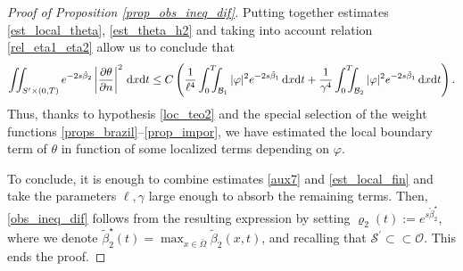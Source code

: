 \documentclass[preprint,10pt]{article}
\numberwithin{equation}{section}
\numberwithin{theorem}{section}
\def\dx{\,\textnormal{d}x}
\def\dt{\textnormal{d}t}
\def\dx{\,\textnormal{d}x}
\def\dt{\textnormal{d}t}
\begin{document}
{\begin{proof}[Proof of Proposition \ref{prop_obs_ineq_dif}]
Putting together estimates \eqref{est_local_theta}, \eqref{est_theta_h2} and taking into account relation \eqref{rel_eta1_eta2} allow us to conclude that
%
\begin{equation}\label{est_local_fin}
\iint_{S^{\prime}\times(0,T)}e^{-2s\tilde\beta_2}\left|\frac{\partial \theta}{\partial n}\right|^2\dx\dt  \leq C\left(\frac{1}{\ell^4}\int_0^T\!\!\!\!\int_{\mathcal B_1}|\varphi|^2e^{-2s\tilde{\beta}_1}\dx\dt+\frac{1}{\gamma^4}\int_0^T\!\!\!\!\int_{\mathcal B_2}|\varphi|^2e^{-2s\tilde{\beta}_1}\dx\dt\right).
\end{equation}
%
Thus, thanks to hypothesis \eqref{loc_teo2} and the special selection of the weight functions \eqref{props_brazil}--\eqref{prop_impor}, we have estimated the local boundary term of $\theta$ in function of some localized terms depending on $\varphi$. 

To conclude, it is enough to combine estimates \eqref{aux7} and \eqref{est_local_fin} and take the parameters $\ell,\gamma$ large enough to absorb the remaining terms. Then, \eqref{obs_ineq_dif} follows from the resulting expression by setting $\varrho_2(t):=e^{s\tilde\beta_2^\star}$, where we denote $\tilde{\beta}_2^\star(t)=\max_{x\in\overline{\Omega}}\tilde\beta_2(x,t)$, and recalling that $\mathcal S^\prime\subset\subset \mathcal O$.  This ends the proof. 
%
\end{proof}


}
\end{document}
